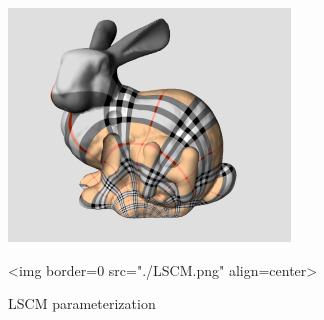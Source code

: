 \begin{figure}[bht]
    \begin{center}
        \begin{ccTexOnly}
            \includegraphics{Parameterization/LSCM} %
        \end{ccTexOnly}
        \begin{ccHtmlOnly}
            <img border=0 src="./LSCM.png" align=center>
        \end{ccHtmlOnly}
        \label{parameterization-fig-LSCM}

        \caption{LSCM parameterization}
    \end{center}
\end{figure}


